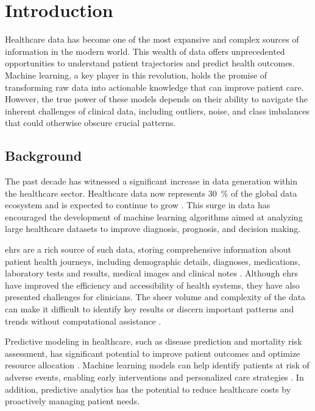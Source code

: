 \chapter{Introduction}
\label{ch:introduction}


Healthcare data has become one of the most expansive and complex sources of information in the modern world. This wealth of data offers unprecedented opportunities to understand patient trajectories and predict health outcomes. Machine learning, a key player in this revolution, holds the promise of transforming raw data into actionable knowledge that can improve patient care. However, the true power of these models depends on their ability to navigate the inherent challenges of clinical data, including outliers, noise, and class imbalances that could otherwise obscure crucial patterns.

\section{Background}

The past decade has witnessed a significant increase in data generation within the healthcare sector. Healthcare data now represents \qty{30}{\percent} of the global data ecosystem and is expected to continue to grow \cite{TransformersHealthcareSurvey2023}. This surge in data has encouraged the development of machine learning algorithms aimed at analyzing large healthcare datasets to improve diagnosis, prognosis, and decision making.

\Glspl{ehr} are a rich source of such data, storing comprehensive information about patient health journeys, including demographic details, diagnoses, medications, laboratory tests and results, medical images and clinical notes \cite{DeepLearningElectronic2020}. Although \glspl{ehr} have improved the efficiency and accessibility of health systems, they have also presented challenges for clinicians. The sheer volume and complexity of the data can make it difficult to identify key results or discern important patterns and trends without computational assistance \cite{UsingMachineLearning2016}.

Predictive modeling in healthcare, such as disease prediction and mortality risk assessment, has significant potential to improve patient outcomes and optimize resource allocation \cite{UseElectronicHealth2021}. Machine learning models can help identify patients at risk of adverse events, enabling early interventions and personalized care strategies \cite{emmert2018machine,emmert2016need}. In addition, predictive analytics has the potential to reduce healthcare costs by proactively managing patient needs.

